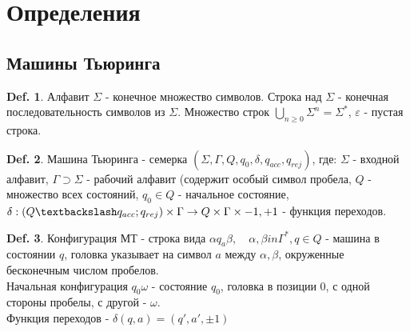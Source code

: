 \documentclass[12pt]{article}
\begin{document}
\renewcommand{\proofname}{Доказательство}

\theoremstyle{plain}
\newtheorem{thm}{Теорема}[section]
\newtheorem*{thesis}{Thesis}[section]
\newtheorem*{lm}{Лемма}
\newtheorem*{st}{Утверждение}
\newtheorem*{prop}{Свойства}

\theoremstyle{definition}
\newtheorem{defn}{Def.}
\newtheorem*{ex}{Пример}
\newtheorem*{exs}{Примеры}
\newtheorem*{cor}{Следствие}
\newtheorem*{name}{Обозначение}

\theoremstyle{remark}
\newtheorem*{rem}{Ремарка}
\newtheorem*{note}{Замечание}
\newtheorem*{probl}{Упражнение}

\newcommand{\Z}{\mathbb{Z}}
\newcommand{\N}{\mathbb{N}}
\newcommand{\R}{\mathbb{R}}
\newcommand{\Q}{\mathbb{Q}}
\newcommand{\K}{\mathbb{K}}
\newcommand{\Cm}{\mathbb{C}}
\newcommand{\Pm}{\mathbb{P}}

\section{Определения}
\subsection{Машины Тьюринга}

\begin{defn}
    Алфавит $\Sigma$ - конечное множество символов. Строка над $\Sigma$ - конечная последовательность символов из $\Sigma$. Множество строк $\bigcup_{n \ge 0} \Sigma ^n = \Sigma ^ *$,  $\varepsilon $ - пустая строка.
\end{defn}
\begin{defn}
    Машина Тьюринга - семерка $(\Sigma, \Gamma, Q, q_0, \delta, q_{acc}, q_{rej})$, где:
    $ \Sigma$ - входной алфавит, $\Gamma \supset \Sigma$ - рабочий алфавит (содержит особый символ пробела, $Q$ - множество всех состояний, $q_0 \in Q$ - начальное состояние, $\delta: (Q \textbackslash  q_{acc} ; q_{rej}) \times \Gamma \to Q \times \Gamma \times {-1, +1}$ - функция переходов.
\end{defn}
\begin{defn}
    Конфигурация МТ - строка вида $\alpha q_a \beta, \quad \alpha, \beta in \Gamma^*, q \in Q$ - машина в состоянии $q$, головка указывает на символ $a$ между $\alpha, \beta$, окруженные бесконечным числом пробелов. \\
    Начальная конфигурация $q_0 \omega$ - состояние  $q_0$, головка в позиции 0, с одной стороны пробелы, с другой - $\omega$.\\
    Функция переходов - $\delta(q, a) = (q', a', \pm 1)$
\end{defn}
\end{document}
